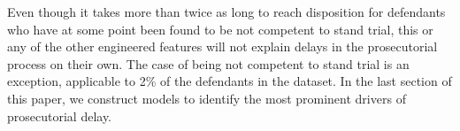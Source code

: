 Even though it takes more than twice as long to reach disposition for
defendants who have at some point been found to be not competent to
stand trial, this or any of the other engineered features will not
explain delays in the prosecutorial process on their own. The case of
being not competent to stand trial is an exception, applicable to 2\%
of the defendants in the dataset. In the last section of this paper,
we construct models to identify the most prominent drivers of
prosecutorial delay.
